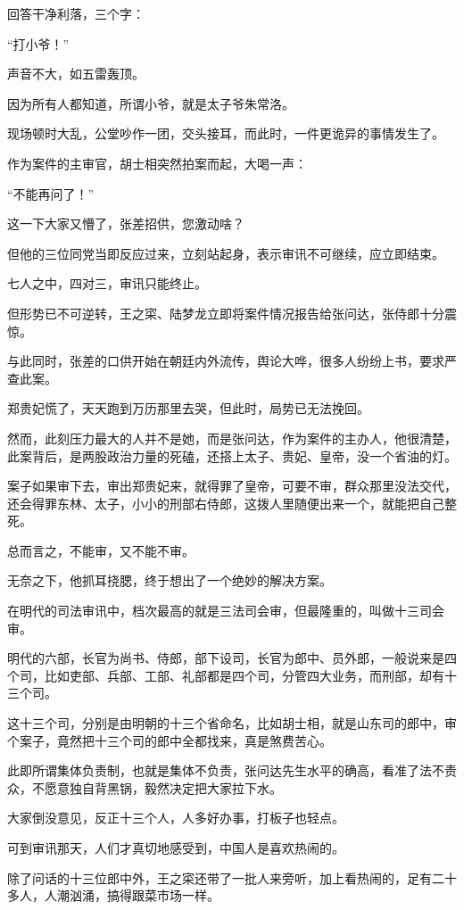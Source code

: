 \begin{multicols}{\theparacolNo}
回答干净利落，三个字：

“打小爷！”

声音不大，如五雷轰顶。

因为所有人都知道，所谓小爷，就是太子爷朱常洛。

现场顿时大乱，公堂吵作一团，交头接耳，而此时，一件更诡异的事情发生了。

作为案件的主审官，胡士相突然拍案而起，大喝一声：

“不能再问了！”

这一下大家又懵了，张差招供，您激动啥？

但他的三位同党当即反应过来，立刻站起身，表示审讯不可继续，应立即结束。

七人之中，四对三，审讯只能终止。

但形势已不可逆转，王之寀、陆梦龙立即将案件情况报告给张问达，张侍郎十分震惊。

与此同时，张差的口供开始在朝廷内外流传，舆论大哗，很多人纷纷上书，要求严查此案。

郑贵妃慌了，天天跑到万历那里去哭，但此时，局势已无法挽回。

然而，此刻压力最大的人并不是她，而是张问达，作为案件的主办人，他很清楚，此案背后，是两股政治力量的死磕，还搭上太子、贵妃、皇帝，没一个省油的灯。

案子如果审下去，审出郑贵妃来，就得罪了皇帝，可要不审，群众那里没法交代，还会得罪东林、太子，小小的刑部右侍郎，这拨人里随便出来一个，就能把自己整死。

总而言之，不能审，又不能不审。

无奈之下，他抓耳挠腮，终于想出了一个绝妙的解决方案。

在明代的司法审讯中，档次最高的就是三法司会审，但最隆重的，叫做十三司会审。

明代的六部，长官为尚书、侍郎，部下设司，长官为郎中、员外郎，一般说来是四个司，比如吏部、兵部、工部、礼部都是四个司，分管四大业务，而刑部，却有十三个司。

这十三个司，分别是由明朝的十三个省命名，比如胡士相，就是山东司的郎中，审个案子，竟然把十三个司的郎中全都找来，真是煞费苦心。

此即所谓集体负责制，也就是集体不负责，张问达先生水平的确高，看准了法不责众，不愿意独自背黑锅，毅然决定把大家拉下水。

大家倒没意见，反正十三个人，人多好办事，打板子也轻点。

可到审讯那天，人们才真切地感受到，中国人是喜欢热闹的。

除了问话的十三位郎中外，王之寀还带了一批人来旁听，加上看热闹的，足有二十多人，人潮汹涌，搞得跟菜市场一样。


\end{multicols}

